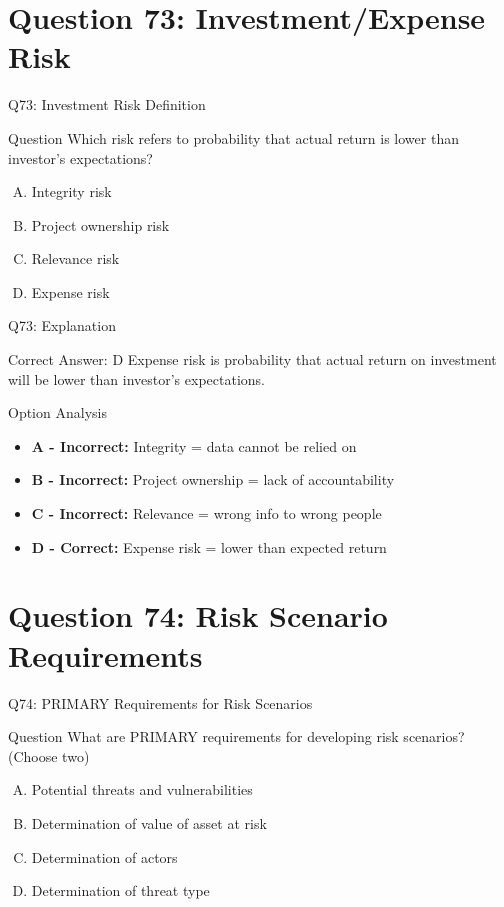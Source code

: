 \documentclass{beamer}
\begin{document}
	
	
	\section{Question 73: Investment/Expense Risk}
	
	\begin{frame}{Q73: Investment Risk Definition}
		\begin{block}{Question}
			Which risk refers to probability that actual return is lower than investor's expectations?
		\end{block}
		\begin{enumerate}[(A)]
			\item Integrity risk
			\item Project ownership risk
			\item Relevance risk
			\item Expense risk
		\end{enumerate}
	\end{frame}
	
	\begin{frame}{Q73: Explanation}
		\begin{block}{Correct Answer: D}
			Expense risk is probability that actual return on investment will be lower than investor's expectations.
		\end{block}
		\begin{block}{Option Analysis}
			\begin{itemize}
				\item \textbf{A - Incorrect:} Integrity = data cannot be relied on
				\item \textbf{B - Incorrect:} Project ownership = lack of accountability
				\item \textbf{C - Incorrect:} Relevance = wrong info to wrong people
				\item \textbf{D - Correct:} Expense risk = lower than expected return
			\end{itemize}
		\end{block}
	\end{frame}
	
	\section{Question 74: Risk Scenario Requirements}
	
	\begin{frame}{Q74: PRIMARY Requirements for Risk Scenarios}
		\begin{block}{Question}
			What are PRIMARY requirements for developing risk scenarios? (Choose two)
		\end{block}
		\begin{enumerate}[(A)]
			\item Potential threats and vulnerabilities
			\item Determination of value of asset at risk
			\item Determination of actors
			\item Determination of threat type
		\end{enumerate}
	\end{frame}
	
\end{document}
